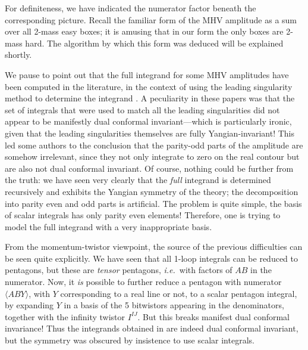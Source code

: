 \documentclass[11pt, reqno]{article}
\newcommand{\ab}[1]{\langle #1\rangle}
\begin{document}
For definiteness, we have indicated the numerator factor beneath the corresponding picture. Recall the familiar form of the MHV amplitude as a sum over all 2-mass easy boxes; it is amusing that in our form the only boxes are 2-mass hard.  The algorithm by which this form was deduced will be explained shortly.

We pause to point out that the full integrand for some MHV amplitudes have been computed in the literature, in the context of using the leading singularity method to determine the integrand \cite{Cachazo:2008vp}. A peculiarity in these papers was that the set of integrals that were used to match all the leading singularities did not appear to be manifestly dual conformal invariant---which is particularly ironic, given that the leading singularities themselves are fully Yangian-invariant! This led some authors to the conclusion that the parity-odd parts of the amplitude are somehow irrelevant, since they not only integrate to zero on the real contour but are also not dual conformal invariant. Of course, nothing could be further from the truth: we have seen very clearly that the {\it full} integrand is determined recursively and exhibits the Yangian symmetry of the theory; the decomposition into parity even and odd parts is artificial. The problem is quite simple, the basis of scalar integrals has only parity even elements! Therefore, one is trying to model the full integrand with a very inappropriate basis.

From the momentum-twistor viewpoint, the source of the previous difficulties can be seen quite explicitly. We have seen that all 1-loop integrals can be reduced to pentagons, but these are {\it tensor} pentagons, {\it i.e.}~with factors of $AB$ in the numerator. Now, it {\it is} possible to further reduce a pentagon with numerator $\ab{AB Y}$, with $Y$ corresponding to a real line or not, to a scalar pentagon integral, by expanding $Y$ in a basis of the 5 bitwistors appearing in the denominators, together with the infinity twistor $I^{IJ}$. But this breaks manifest dual conformal invariance! Thus the integrands obtained in \cite{Cachazo:2008vp,Cachazo:2008hp,Spradlin:2008uu} are indeed dual conformal invariant, but the symmetry was obscured by insistence to use scalar integrals.
\end{document}
